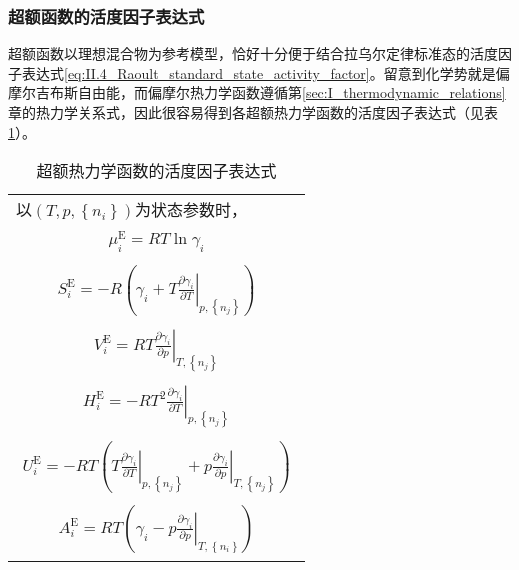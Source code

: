 \documentclass[main.tex]{subfiles}
\begin{document}
\subsubsection{超额函数的活度因子表达式}
超额函数以理想混合物为参考模型，恰好十分便于结合拉乌尔定律标准态的活度因子表达式\eqref{eq:II.4_Raoult_standard_state_activity_factor}。留意到化学势就是偏摩尔吉布斯自由能，而偏摩尔热力学函数遵循第\ref{sec:I_thermodynamic_relations}章的热力学关系式，因此很容易得到各超额热力学函数的活度因子表达式（见表\ref{tab:excess_functions_activity_factor}）。
\begin{longtable}{m{}}
  \caption{超额热力学函数的活度因子表达式}\label{tab:excess_functions_activity_factor}                                                                                                                                      \\
  \hline
  以$\left(T,p,\left\{n_i\right\}\right)$为状态参数时，                                                                                                                                                              \\ [-4ex]


  \begin{align}    \mu_i^\text{E}  =RT\ln\gamma_i    \end{align}                                                                                                                                             \\ [-8ex]
  \begin{align}S_i^\text{E}    =-R\left(\gamma_i+T\left.\frac{\partial\gamma_i}{\partial T}\right|_{p,\left\{n_j\right\}}\right)\end{align}                                                                  \\[-8ex]
  \begin{align}V_i^\text{E}    =RT\left.\frac{\partial\gamma_i}{\partial p}\right|_{T,\left\{n_j\right\}}\end{align}                                                                                         \\[-8ex]
  \begin{align}H_i^\text{E}    =-RT^2\left.\frac{\partial\gamma_i}{\partial T}\right|_{p,\left\{n_j\right\}}\end{align}                                                                                      \\[-8ex]
  \begin{align}U_i^\text{E}    =-RT\left(T\left.\frac{\partial\gamma_i}{\partial T}\right|_{p,\left\{n_j\right\}}+p\left.\frac{\partial\gamma_i}{\partial p}\right|_{T,\left\{n_j\right\}}\right)\end{align} \\[-8ex]
  \begin{align}A_i^\text{E}    =RT\left(\gamma_i-p\left.\frac{\partial\gamma_i}{\partial p}\right|_{T,\left\{n_i\right\}}\right)\end{align}                                                                  \\
  \hline
\end{longtable}
\end{document}
